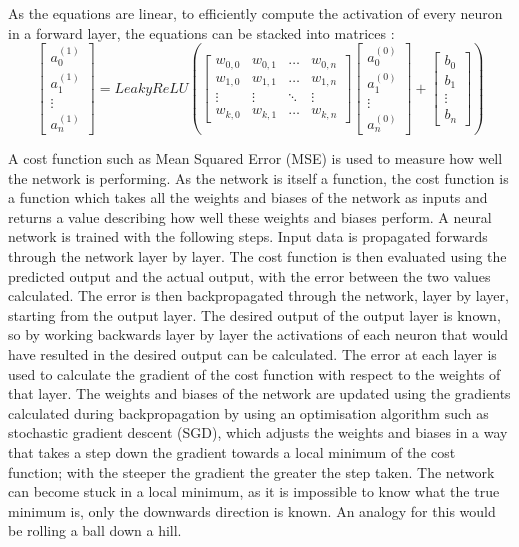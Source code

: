 \documentclass[twocolumn]{article}
\begin{document}
As the equations are linear, to efficiently compute the activation of every neuron in a forward layer, the equations can be stacked into matrices\autocite{3Blue1BrownWhatNeural} :
\begin{equation}
\begin{bmatrix} a^{(1)}_0 \\ a^{(1)}_1 \\ \vdots \\ a_n^{(1)} \end{bmatrix} = LeakyReLU \left( \begin{bmatrix}w_{0,0} & w_{0,1} & \dots & w_{0,n} \\ w_{1,0} & w_{1,1} & \dots & w_{1,n} \\ \vdots & \vdots & \ddots & \vdots \\ w_{k,0} & w_{k,1} & \dots & w_{k,n} \end{bmatrix} \begin{bmatrix} a_0^{(0)} \\ a_1^{(0)} \\ \vdots \\ a_n^{(0)} \end{bmatrix} + \begin{bmatrix} b_0 \\ b_1 \\ \vdots \\ b_n \end{bmatrix} \right)
\end{equation}

A cost function such as Mean Squared Error (MSE) is used to measure how well the network is performing.
As the network is itself a function, the cost function is a function which takes all the weights and biases of the network as inputs and returns a value describing how well these weights and biases perform.
A neural network is trained with the following steps.
Input data is propagated forwards through the network layer by layer.
The cost function is then evaluated using the predicted output and the actual output, with the error between the two values calculated.
The error is then backpropagated through the network, layer by layer, starting from the output layer.
The desired output of the output layer is known, so by working backwards layer by layer the activations of each neuron that would have resulted in the desired output can be calculated.
The error at each layer is used to calculate the gradient of the cost function with respect to the weights of that layer\autocite{leTutorialDeepLearning2015}.
The weights and biases of the network are updated using the gradients calculated during backpropagation by using an optimisation algorithm such as stochastic gradient descent (SGD)\autocite{ruderOverviewGradientDescent2016}, which adjusts the weights and biases in a way that takes a step down the gradient towards a local minimum of the cost function; with the steeper the gradient the greater the step taken.
The network can become stuck in a local minimum, as it is impossible to know what the true minimum is, only the downwards direction is known.
An analogy for this would be rolling a ball down a hill.
\end{document}
